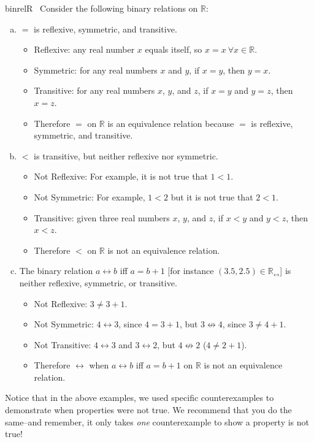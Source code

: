 \begin{example}{binrelR} \ 
Consider the following binary relations on ${\mathbb R}$:
\begin{enumerate}[(a)]
\item $=$ is reflexive, symmetric, and transitive.
\begin{itemize}
\item 
Reflexive:  any real number $x$ equals itself, so $x=x~\forall x \in {\mathbb R}$.
\item
Symmetric:  for any real numbers $x$ and $y$, if $x = y$, then $y = x$. 
\item
Transitive:  for any real numbers $x$, $y$, and $z$, if $x = y$ and $y = z$, then $x = z$.
\item
Therefore $=$ on $\mathbb{R}$ is an equivalence relation because $=$ is reflexive, symmetric, and transitive.
\end{itemize}
\item $<$ is transitive, but neither reflexive nor symmetric.
\begin{itemize}
\item
Not Reflexive:  For example, it is not true that $1 < 1$.
\item
Not Symmetric:  For example, $1 < 2$ but it is not true that $2 < 1$.
\item
Transitive:  given three real numbers $x$, $y$, and $z$, if $x < y$ and $y < z$, then $x < z$.
\item
Therefore $<$ on $\mathbb{R}$ is not an equivalence relation.
\end{itemize}
\item
The binary relation $a \rel b$ iff $a = b + 1$ [for instance $(3.5,2.5) \in {\mathbb R}_\rel$] is neither reflexive, symmetric, or transitive.
\begin{itemize}
\item
Not Reflexive:  $3 \neq 3 + 1$.
\item
Not Symmetric:  $4 \rel 3$, since $4 = 3 + 1$, but $3 \not\rel 4$, since $3 \neq 4 + 1$.
\item
Not Transitive:  $4 \rel 3$ and $3 \rel 2$, but $4 \not\rel 2$ ($4 \neq 2 + 1$).
\item
Therefore $\rel$ when $a \rel b$ iff $a = b + 1$ on $\mathbb{R}$ is not an equivalence relation.
\end{itemize}  
\end{enumerate}
\end{example}

Notice that in the above examples, we used specific counterexamples to demonstrate when properties were not true.  We recommend that you do the same--and remember, it only takes \emph{one} counterexample to show a property is not true! 

